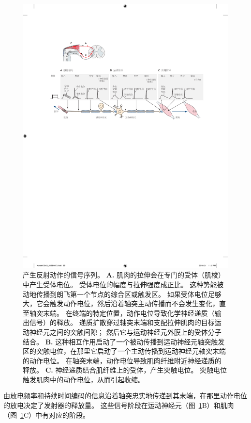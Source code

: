 \begin{figure}[htbp]
	\centering
	\includegraphics[width=1.0\linewidth]{chap03/fig_3_10}
	\caption{产生反射动作的信号序列。
		\textbf{A.} 肌肉的拉伸会在专门的受体（肌梭）中产生受体电位。 
		受体电位的幅度与拉伸强度成正比。 
		这种势能被动地传播到朗飞第一个节点的综合区或触发区。
		如果受体电位足够大，它会触发动作电位，然后沿着轴突主动传播而不会发生变化，直至轴突末端。
		在终端的特定位置，动作电位导致化学神经递质（输出信号）的释放。
		递质扩散穿过轴突末端和支配拉伸肌肉的目标运动神经元之间的突触间隙；
		然后它与运动神经元外膜上的受体分子结合。
		\textbf{B.} 这种相互作用启动了一个被动传播到运动神经元轴突触发区的突触电位，在那里它启动了一个主动传播到运动神经元轴突末端的动作电位。
		在轴突末端，动作电位导致肌肉纤维附近神经递质的释放。
		\textbf{C.} 神经递质结合肌纤维上的受体，产生突触电位。
		突触电位触发肌肉中的动作电位，从而引起收缩。}
	\label{fig:3_10}
\end{figure}


由放电频率和持续时间编码的信息沿着轴突忠实地传递到其末端，在那里动作电位的放电决定了发射器的释放量。 
这些信号阶段在运动神经元（图~\ref{fig:3_10}B）和肌肉（图~\ref{fig:3_10}C）中有对应的阶段。


